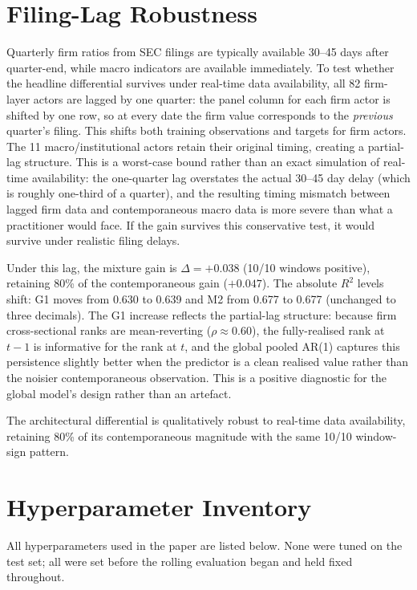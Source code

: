 \documentclass[11pt,a4paper]{article}
\begin{document}
\section{Filing-Lag Robustness}
\label{app:lag}

Quarterly firm ratios from SEC filings are typically available 30--45 days after quarter-end, while macro indicators are available immediately. To test whether the headline differential survives under real-time data availability, all 82 firm-layer actors are lagged by one quarter: the panel column for each firm actor is shifted by one row, so at every date the firm value corresponds to the \emph{previous} quarter's filing. This shifts both training observations and targets for firm actors. The 11 macro/institutional actors retain their original timing, creating a partial-lag structure. This is a worst-case bound rather than an exact simulation of real-time availability: the one-quarter lag overstates the actual 30--45 day delay (which is roughly one-third of a quarter), and the resulting timing mismatch between lagged firm data and contemporaneous macro data is more severe than what a practitioner would face. If the gain survives this conservative test, it would survive under realistic filing delays.

Under this lag, the mixture gain is $\Delta = +0.038$ (10/10 windows positive), retaining 80\% of the contemporaneous gain ($+0.047$). The absolute $R^2$ levels shift: G1 moves from 0.630 to 0.639 and M2 from 0.677 to 0.677 (unchanged to three decimals). The G1 increase reflects the partial-lag structure: because firm cross-sectional ranks are mean-reverting ($\rho \approx 0.60$), the fully-realised rank at $t{-}1$ is informative for the rank at $t$, and the global pooled AR(1) captures this persistence slightly better when the predictor is a clean realised value rather than the noisier contemporaneous observation. This is a positive diagnostic for the global model's design rather than an artefact.

The architectural differential is qualitatively robust to real-time data availability, retaining 80\% of its contemporaneous magnitude with the same 10/10 window-sign pattern.

\section{Hyperparameter Inventory}
\label{app:hyperparams}

All hyperparameters used in the paper are listed below. None were tuned on the test set; all were set before the rolling evaluation began and held fixed throughout.
\end{document}
